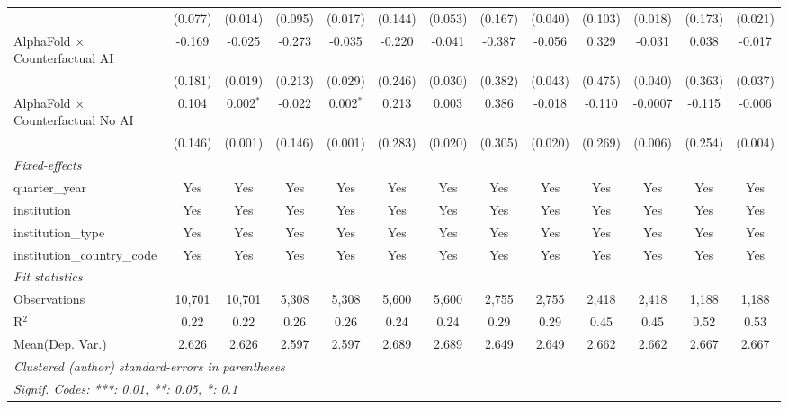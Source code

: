 \begin{tabular}{lcccccccccccc}
                                            & (0.077)      & (0.014)     & (0.095)     & (0.017)     & (0.144)       & (0.053)     & (0.167) & (0.040) & (0.103) & (0.018) & (0.173) & (0.021)\\   
   AlphaFold $\times$ Counterfactual AI     & -0.169       & -0.025      & -0.273      & -0.035      & -0.220        & -0.041      & -0.387  & -0.056  & 0.329   & -0.031  & 0.038   & -0.017\\   
                                            & (0.181)      & (0.019)     & (0.213)     & (0.029)     & (0.246)       & (0.030)     & (0.382) & (0.043) & (0.475) & (0.040) & (0.363) & (0.037)\\   
   AlphaFold $\times$ Counterfactual No AI  & 0.104        & 0.002$^{*}$ & -0.022      & 0.002$^{*}$ & 0.213         & 0.003       & 0.386   & -0.018  & -0.110  & -0.0007 & -0.115  & -0.006\\   
                                            & (0.146)      & (0.001)     & (0.146)     & (0.001)     & (0.283)       & (0.020)     & (0.305) & (0.020) & (0.269) & (0.006) & (0.254) & (0.004)\\   
   \midrule
   \emph{Fixed-effects}\\
   quarter\_year                            & Yes          & Yes         & Yes         & Yes         & Yes           & Yes         & Yes     & Yes     & Yes     & Yes     & Yes     & Yes\\  
   institution                              & Yes          & Yes         & Yes         & Yes         & Yes           & Yes         & Yes     & Yes     & Yes     & Yes     & Yes     & Yes\\  
   institution\_type                        & Yes          & Yes         & Yes         & Yes         & Yes           & Yes         & Yes     & Yes     & Yes     & Yes     & Yes     & Yes\\  
   institution\_country\_code               & Yes          & Yes         & Yes         & Yes         & Yes           & Yes         & Yes     & Yes     & Yes     & Yes     & Yes     & Yes\\  
   \midrule
   \emph{Fit statistics}\\
   Observations                             & 10,701       & 10,701      & 5,308       & 5,308       & 5,600         & 5,600       & 2,755   & 2,755   & 2,418   & 2,418   & 1,188   & 1,188\\  
   R$^2$                                    & 0.22         & 0.22        & 0.26        & 0.26        & 0.24          & 0.24        & 0.29    & 0.29    & 0.45    & 0.45    & 0.52    & 0.53\\  
Mean(Dep. Var.) & 2.626 & 2.626 & 2.597 & 2.597 & 2.689 & 2.689 & 2.649 & 2.649 & 2.662 & 2.662 & 2.667 & 2.667 \\
   \midrule \midrule
   \multicolumn{13}{l}{\emph{Clustered (author) standard-errors in parentheses}}\\
   \multicolumn{13}{l}{\emph{Signif. Codes: ***: 0.01, **: 0.05, *: 0.1}}\\
\end{tabular}
\par\endgroup
